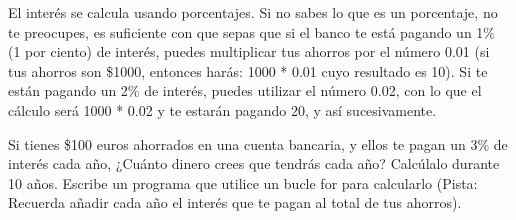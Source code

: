 El interés se calcula usando porcentajes.  Si no sabes lo que es un porcentaje, no te preocupes, es suficiente con que sepas que si el banco te está pagando un 1\% (1 por ciento) de interés, puedes multiplicar tus ahorros por el número 0.01 (si tus ahorros son \$1000, entonces harás: 1000 * 0.01 cuyo resultado es 10). Si te están pagando un 2\% de interés, puedes utilizar el número 0.02, con lo que el cálculo será 1000 * 0.02 y te estarán pagando 20, y así sucesivamente.

Si tienes \$100 euros ahorrados en una cuenta bancaria, y ellos te pagan un 3\% de interés cada año, ¿Cuánto dinero crees que tendrás cada año? Calcúlalo durante 10 años. Escribe un programa que utilice un bucle for para calcularlo (Pista: Recuerda añadir cada año el interés que te pagan al total de tus ahorros). 
\newpage
